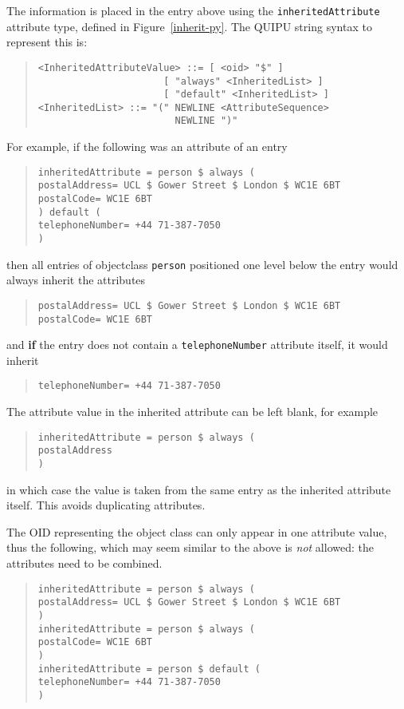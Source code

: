 
The information is placed in the entry above using the \verb+inheritedAttribute+
attribute type, defined in Figure~\ref{inherit-py}. The QUIPU string syntax
to represent this is:
\begin{quote}\begin{verbatim}
<InheritedAttributeValue> ::= [ <oid> "$" ] 
                      [ "always" <InheritedList> ]
                      [ "default" <InheritedList> ]
<InheritedList> ::= "(" NEWLINE <AttributeSequence> 
                        NEWLINE ")"
\end{verbatim}\end{quote}

For example, if the following was an attribute of an entry
\begin{quote}\begin{verbatim}
inheritedAttribute = person $ always (
postalAddress= UCL $ Gower Street $ London $ WC1E 6BT
postalCode= WC1E 6BT
) default (
telephoneNumber= +44 71-387-7050
)
\end{verbatim}\end{quote}
then all entries of objectclass \verb+person+ positioned one level
below the entry would always inherit the attributes
\begin{quote}\begin{verbatim}
postalAddress= UCL $ Gower Street $ London $ WC1E 6BT
postalCode= WC1E 6BT
\end{verbatim}\end{quote}
and {\bf if} the entry does not contain a \verb+telephoneNumber+ attribute itself,
it would inherit
\begin{quote}\begin{verbatim}
telephoneNumber= +44 71-387-7050
\end{verbatim}\end{quote}

The attribute value in the inherited attribute can be left blank, for example
\begin{quote}\begin{verbatim}
inheritedAttribute = person $ always (
postalAddress
)
\end{verbatim}\end{quote}
in which case the value is taken from the same entry as the
inherited attribute itself.  This avoids duplicating attributes.

The OID representing the object class can only appear in one attribute value,
thus the following, which may seem similar to the above is {\em not}
allowed: the attributes need to be combined.
\begin{quote}\begin{verbatim}
inheritedAttribute = person $ always (
postalAddress= UCL $ Gower Street $ London $ WC1E 6BT
)
inheritedAttribute = person $ always (
postalCode= WC1E 6BT
)
inheritedAttribute = person $ default (
telephoneNumber= +44 71-387-7050
)
\end{verbatim}\end{quote}

